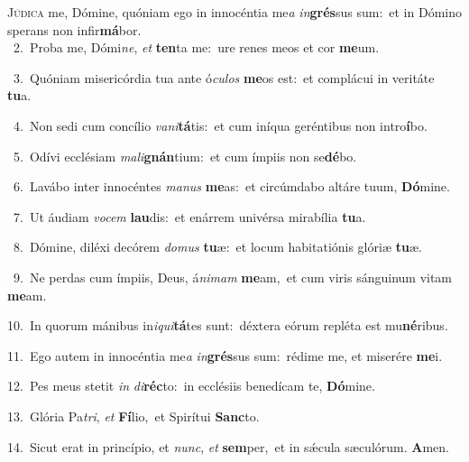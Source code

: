 \lettrine{\initial\textcolor{\initialcolor}{J}}{údica} me, Dómine, quóniam ego in innocéntia me\textit{a} \textit{in}\-\textbf{grés}sus sum:~\star et in Dómino sperans non infir\-\textbf{má}\-bor.\\
{\numbfont\textcolor{\numbcolor}{~2.}}~Proba me, Dómi\-\textit{ne}\-, \textit{et} \textbf{ten}\-ta me:~\star ure renes meos et cor \textbf{me}\-um.\par
{\numbfont\textcolor{\numbcolor}{~3.}}~Quóniam misericórdia tua ante ó\-\textit{cu}\-\textit{los} \textbf{me}\-os est:~\star et complácui in veritáte \textbf{tu}\-a.\par
{\numbfont\textcolor{\numbcolor}{~4.}}~Non sedi cum concílio \textit{va}\-\textit{ni}\textbf{tá}tis:~\star et cum iníqua geréntibus non intro\-\textbf{í}\-bo.\par
{\numbfont\textcolor{\numbcolor}{~5.}}~Odívi ecclésiam \textit{ma}\-\textit{li}\textbf{gnán}tium:~\star et cum ímpiis non se\-\textbf{dé}\-bo.\par
{\numbfont\textcolor{\numbcolor}{~6.}}~Lavábo inter innocéntes \textit{ma}\-\textit{nus} \textbf{me}\-as:~\star et circúmdabo altáre tuum, \textbf{Dó}\-mine.\par
{\numbfont\textcolor{\numbcolor}{~7.}}~Ut áudiam \textit{vo}\-\textit{cem} \textbf{lau}\-dis:~\star et enárrem univérsa mirabília \textbf{tu}\-a.\par
{\numbfont\textcolor{\numbcolor}{~8.}}~Dómine, diléxi decórem \textit{do}\-\textit{mus} \textbf{tu}\-æ:~\star et locum habitatiónis glóriæ \textbf{tu}\-æ.\par
{\numbfont\textcolor{\numbcolor}{~9.}}~Ne perdas cum ímpiis, Deus, á\-\textit{ni}\-\textit{mam} \textbf{me}\-am,~\star et cum viris sánguinum vitam \textbf{me}\-am.\par
{\numbfont\textcolor{\numbcolor}{10.}}~In quorum mánibus in\-\textit{i}\-\textit{qui}\textbf{tá}tes sunt:~\star déxtera eórum repléta est mu\-\textbf{né}\-ribus.\par
{\numbfont\textcolor{\numbcolor}{11.}}~Ego autem in innocéntia me\textit{a} \textit{in}\-\textbf{grés}sus sum:~\star rédime me, et miserére \textbf{me}\-i.\par
{\numbfont\textcolor{\numbcolor}{12.}}~Pes meus stetit \textit{in} \textit{di}\-\textbf{réc}to:~\star in ecclésiis benedícam te, \textbf{Dó}\-mine.\par
{\numbfont\textcolor{\numbcolor}{13.}}~Glória Pa\-\textit{tri}\-, \textit{et} \textbf{Fí}\-lio,~\star et Spirítui \textbf{Sanc}\-to.\par
{\numbfont\textcolor{\numbcolor}{14.}}~Sicut erat in princípio, et \textit{nunc}\-, \textit{et} \textbf{sem}\-per,~\star et in sǽcula sæculórum. \textbf{A}\-men.\par
